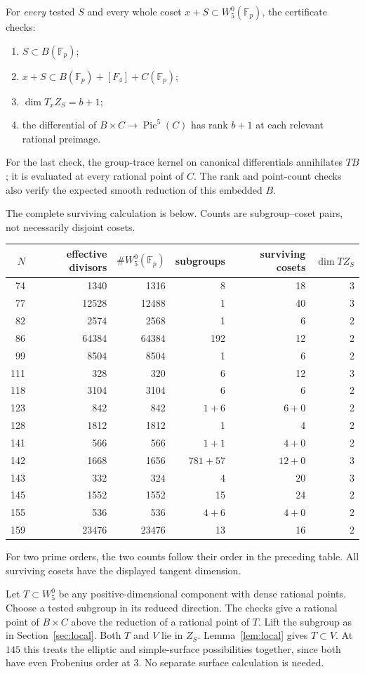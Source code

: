 \documentclass[11pt,a4paper]{article}
\newcommand{\F}{\mathbb F}
\newcommand{\Pic}{\operatorname{Pic}}
\newcommand{\W}{W^0_5}
\begin{document}
For \emph{every} tested $S$ and every whole coset $x+S\subset\W(\F_p)$,
the certificate checks:
\begin{enumerate}
\item $S\subset B(\F_p)$;
\item $x+S\subset B(\F_p)+[F_4]+C(\F_p)$;
\item $\dim T_x Z_S=b+1$;
\item the differential of $B\times C\to\Pic^5(C)$ has rank $b+1$
at each relevant rational preimage.
\end{enumerate}
For the last check, the group-trace kernel on canonical differentials
annihilates $T B$; it is evaluated at every rational point of $C$.
The rank and point-count checks also verify the expected smooth
reduction of this embedded $B$.

The complete surviving calculation is below. Counts are
subgroup--coset pairs, not necessarily disjoint cosets.
\begin{center}\small
\begin{tabular}{@{}rrrrrr@{}}
\toprule $N$&effective divisors&$\#\W(\F_p)$&subgroups&
surviving cosets&$\dim T Z_S$\\
\midrule
74&1340&1316&8&18&3\\
77&12528&12488&1&40&3\\
82&2574&2568&1&6&2\\
86&64384&64384&192&12&2\\
99&8504&8504&1&6&2\\
111&328&320&6&12&3\\
118&3104&3104&6&6&2\\
123&842&842&$1+6$&$6+0$&2\\
128&1812&1812&1&4&2\\
141&566&566&$1+1$&$4+0$&2\\
142&1668&1656&$781+57$&$12+0$&3\\
143&332&324&4&20&3\\
145&1552&1552&15&24&2\\
155&536&536&$4+6$&$4+0$&2\\
159&23476&23476&13&16&2\\
\bottomrule
\end{tabular}
\end{center}
For two prime orders, the two counts follow their order in the preceding
table. All surviving cosets have the displayed tangent dimension.

Let $T\subset\W$ be any positive-dimensional component with dense
rational points. Choose a tested subgroup in its reduced direction.
The checks give a rational point of $B\times C$ above the reduction
of a rational point of $T$. Lift the subgroup as in
Section~\ref{sec:local}. Both $T$ and $V$ lie in $Z_S$.
Lemma~\ref{lem:local} gives $T\subset V$.
At $145$ this treats the elliptic and simple-surface possibilities
together, since both have even Frobenius order at $3$.
No separate surface calculation is needed.
\end{document}
